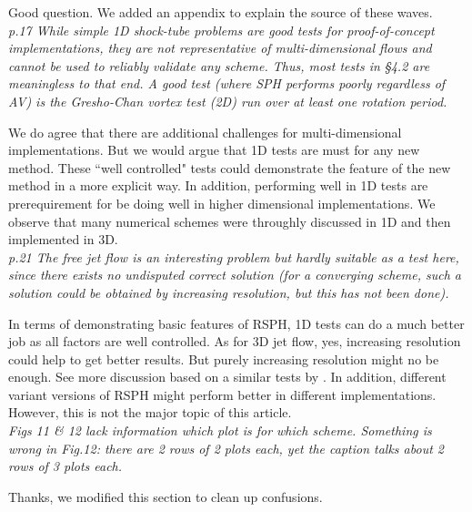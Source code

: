 \documentclass[10pt,a4paper]{article}
\begin{document}
Good question. We added an appendix to explain the source of these waves.
\\[3pt]

\textit{p.17 While simple 1D shock-tube problems are good tests for proof-of-concept implementations, they are not representative of
multi-dimensional flows and cannot be used to reliably validate any scheme. Thus, most tests in §4.2 are meaningless to that end.
A good test (where SPH performs poorly regardless of AV) is the Gresho-Chan vortex test (2D) run over at least one rotation period.}

We do agree that there are additional challenges for multi-dimensional implementations. But we would argue that 1D tests are must for any new method. These ``well controlled" tests could demonstrate the feature of the new method in a more explicit way. In addition, performing well in 1D tests are prerequirement for be doing well in higher dimensional implementations. We observe that many numerical schemes were throughly discussed in 1D and then implemented in 3D.
\\[3pt]

\textit{p.21 The free jet flow is an interesting problem but hardly suitable as a
test here, since there exists no undisputed correct solution (for a converging scheme, such a solution could be obtained by increasing resolution, but this has not been done).}

In terms of demonstrating basic features of RSPH, 1D tests can do a much better job as all factors are well controlled. 
As for 3D jet flow, yes, increasing resolution could help to get better results. But purely increasing resolution might no be enough. See more discussion based on a similar tests by \citet{cha2010kelvin}. 
In addition, different variant versions of RSPH might perform better in different implementations. However, this is not the major topic of this article.
\\[3pt]

\textit{Figs 11 \& 12 lack information which plot is for which scheme. Something is wrong in Fig.12: there are 2 rows of 2 plots each, yet the caption
talks about 2 rows of 3 plots each.}

Thanks, we modified this section to clean up confusions.
\\[3pt]


\end{document}
